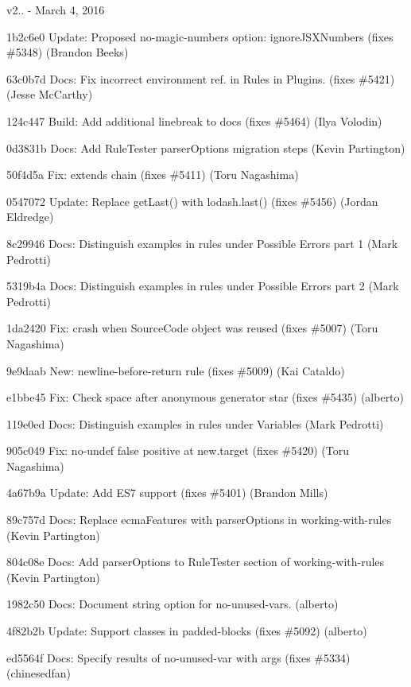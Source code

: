 v2.. -\/ March 4, 2016


\begin{DoxyItemize}
\item 1b2c6e0 Update\+: Proposed no-\/magic-\/numbers option\+: ignore\+J\+S\+X\+Numbers (fixes \#5348) (Brandon Beeks)
\item 63c0b7d Docs\+: Fix incorrect environment ref. in Rules in Plugins. (fixes \#5421) (Jesse Mc\+Carthy)
\item 124c447 Build\+: Add additional linebreak to docs (fixes \#5464) (Ilya Volodin)
\item 0d3831b Docs\+: Add Rule\+Tester parser\+Options migration steps (Kevin Partington)
\item 50f4d5a Fix\+: extends chain (fixes \#5411) (Toru Nagashima)
\item 0547072 Update\+: Replace get\+Last() with lodash.\+last() (fixes \#5456) (Jordan Eldredge)
\item 8c29946 Docs\+: Distinguish examples in rules under Possible Errors part 1 (Mark Pedrotti)
\item 5319b4a Docs\+: Distinguish examples in rules under Possible Errors part 2 (Mark Pedrotti)
\item 1da2420 Fix\+: crash when Source\+Code object was reused (fixes \#5007) (Toru Nagashima)
\item 9e9daab New\+: newline-\/before-\/return rule (fixes \#5009) (Kai Cataldo)
\item e1bbe45 Fix\+: Check space after anonymous generator star (fixes \#5435) (alberto)
\item 119e0ed Docs\+: Distinguish examples in rules under Variables (Mark Pedrotti)
\item 905c049 Fix\+: {\ttfamily no-\/undef} false positive at new.\+target (fixes \#5420) (Toru Nagashima)
\item 4a67b9a Update\+: Add E\+S7 support (fixes \#5401) (Brandon Mills)
\item 89c757d Docs\+: Replace ecma\+Features with parser\+Options in working-\/with-\/rules (Kevin Partington)
\item 804c08e Docs\+: Add parser\+Options to Rule\+Tester section of working-\/with-\/rules (Kevin Partington)
\item 1982c50 Docs\+: Document string option for {\ttfamily no-\/unused-\/vars}. (alberto)
\item 4f82b2b Update\+: Support classes in {\ttfamily padded-\/blocks} (fixes \#5092) (alberto)
\item ed5564f Docs\+: Specify results of {\ttfamily no-\/unused-\/var} with {\ttfamily args} (fixes \#5334) (chinesedfan)

\end{DoxyItemize}
